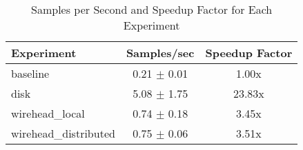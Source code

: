 
\begin{table}[h]
\centering
\begin{tabular}{lcc}
\hline
Experiment & Samples/sec & Speedup Factor \\
\hline
baseline & 0.21 $\pm$ 0.01 & 1.00x \\
disk & 5.08 $\pm$ 1.75 & 23.83x \\
wirehead\_local & 0.74 $\pm$ 0.18 & 3.45x \\
wirehead\_distributed & 0.75 $\pm$ 0.06 & 3.51x \\
\hline
\end{tabular}
\caption{Samples per Second and Speedup Factor for Each Experiment}
\label{tab:samples_per_second}
\end{table}
